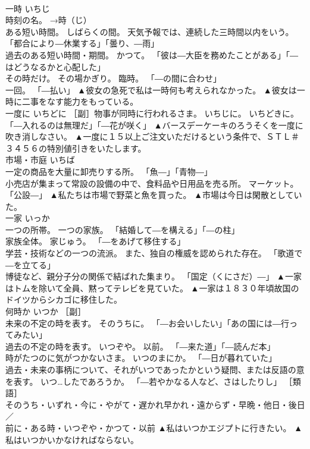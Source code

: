 \documentclass[8pt]{extreport}
\begin{document}
\begin{CJK}{UTF8}{min}
\\	一時	いちじ	
\\	時刻の名。 →時（じ） 
\\	ある短い時間。 しばらくの間。 天気予報では、連続した三時間以内をいう。 「都合により―休業する」「曇り、―雨」 
\\	過去のある短い時間・期間。 かつて。 「彼は―大臣を務めたことがある」「―はどうなるかと心配した」 
\\	その時だけ。 その場かぎり。 臨時。 「―の間に合わせ」 
\\	一回。 「―払い」	▲彼女の急死で私は一時何も考えられなかった。 ▲彼女は一時に二事をなす能力をもっている。
\\	一度に	いちどに	［副］物事が同時に行われるさま。 いちじに。 いちどきに。 「―入れるのは無理だ」「―花が咲く」	▲バースデーケーキのろうそくを一度に吹き消しなさい。 ▲一度に１５以上ご注文いただけるという条件で、ＳＴＬ＃３４５６の特別値引きをいたします。
\\	市場・市庭	いちば	
\\	一定の商品を大量に卸売りする所。 「魚―」「青物―」 
\\	小売店が集まって常設の設備の中で、食料品や日用品を売る所。 マーケット。 「公設―」	▲私たちは市場で野菜と魚を買った。 ▲市場は今日は閑散としていた。
\\	一家	いっか	
\\	一つの所帯。 一つの家族。 「結婚して―を構える」「―の柱」 
\\	家族全体。 家じゅう。 「―をあげて移住する」 
\\	学芸・技術などの一つの流派。 また、独自の権威を認められた存在。 「歌道で―を立てる」 
\\	博徒など、親分子分の関係で結ばれた集まり。 「国定（くにさだ）―」	▲一家はトムを除いて全員、黙ってテレビを見ていた。 ▲一家は１８３０年頃故国のドイツからシカゴに移住した。
\\	何時か	いつか	［副］ 
\\	未来の不定の時を表す。 そのうちに。 「―お会いしたい」「あの国には―行ってみたい」 
\\	過去の不定の時を表す。 いつぞや。 以前。 「―来た道」「―読んだ本」 
\\	時がたつのに気がつかないさま。 いつのまにか。 「―日が暮れていた」 
\\	過去・未来の事柄について、それがいつであったかという疑問、または反語の意を表す。 いつ…したであろうか。 「―若やかなる人など、さはしたりし」 ［類語］
\\	そのうち・いずれ・今に・やがて・遅かれ早かれ・遠からず・早晩・他日・後日／
\\	前に・ある時・いつぞや・かつて・以前	▲私はいつかエジプトに行きたい。 ▲私はいつかいかなければならない。

\end{CJK}
\end{document}

